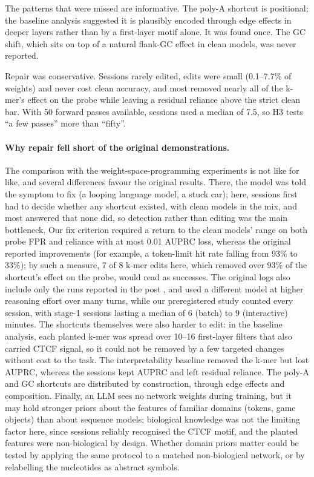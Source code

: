 \documentclass[11pt]{article}
\begin{document}
The patterns that were missed are informative. The poly-A shortcut is positional; the baseline analysis suggested it is
plausibly encoded through edge effects in deeper layers rather than by a first-layer motif alone. It was found
once. The GC shift, which sits on top of a natural flank-GC effect in clean models, was never reported.

Repair was conservative. Sessions rarely edited, edits were small (0.1--7.7\% of weights) and never cost clean
accuracy, and most removed nearly all of the k-mer's effect on the probe while leaving a residual reliance above the
strict clean bar. With 50 forward passes available, sessions used a median of 7.5, so H3 tests ``a few passes'' more
than ``fifty''.

\paragraph{Why repair fell short of the original demonstrations.} The comparison with the weight-space-programming
experiments \citep{takehi2026wsp} is not like for like, and several differences favour the original results. There,
the model was told the symptom to fix (a looping language model, a stuck car); here, sessions first had to decide
whether any shortcut existed, with clean models in the mix, and most answered that none did, so detection rather than
editing was the main bottleneck. Our fix criterion required a return to the clean models' range on both probe FPR and
reliance with at most 0.01 AUPRC loss, whereas the original reported improvements (for example, a token-limit hit
rate falling from 93\% to 33\%); by such a measure, 7 of 8 k-mer edits here, which removed over 93\% of the shortcut's
effect on the probe, would read as successes. The original logs also include only the runs reported in the post
\citep{takehi2026logs}, and used a different model at higher reasoning effort over many turns, while our
preregistered study counted every session, with stage-1 sessions lasting a median of 6 (batch) to 9 (interactive)
minutes. The shortcuts themselves were also harder to edit: in the baseline analysis, each planted k-mer was spread
over 10--16 first-layer filters that also carried CTCF signal, so it could not be removed by a few targeted changes
without cost to the task. The interpretability baseline removed the k-mer but lost AUPRC, whereas the sessions kept
AUPRC and left residual reliance. The poly-A and GC shortcuts are distributed by construction, through edge effects
and composition. Finally, an LLM sees no network weights during training, but it may hold stronger priors about the
features of familiar domains (tokens, game objects) than about sequence models; biological knowledge was not the
limiting factor here, since sessions reliably recognised the CTCF motif, and the planted features were non-biological
by design. Whether domain priors matter could be tested by applying the same protocol to a matched non-biological
network, or by relabelling the nucleotides as abstract symbols.
\end{document}
